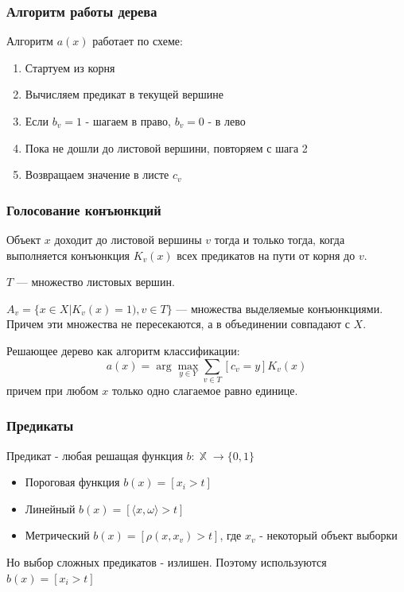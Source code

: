 \documentclass{beamer}
\DeclareMathOperator{\X}{\mathbb{X}}
\begin{document}
	\begin{frame}
		\frametitle{Алгоритм работы дерева}

		Алгоритм $a(x)$ работает по схеме:
		\begin{enumerate}
			\item Стартуем из корня
			\item Вычисляем предикат в текущей вершине
			\item Если $b_v = 1$ - шагаем в право, $b_v = 0$ - в лево
			\item Пока не дошли до листовой вершини, повторяем с шага 2
			\item Возвращаем значение в листе $c_v$
		\end{enumerate}
	\end{frame}

	\begin{frame}
		\frametitle{Голосование конъюнкций}
	
		Объект $x$ доходит до листовой вершины $v$ тогда и только тогда, когда выполняется конъюнкция
		$K_v(x)$ всех предикатов на пути от корня до $v$.

		\vspace{15pt}

		$T$ --- множество листовых вершин. 
		
		$A_v = \{x \in X | K_v(x) = 1), v \in T\}$ --- множества выделяемые конъюнкциями.
		Причем эти множества не пересекаются, а в объединении совпадают с $X$.
		
		\vspace{15pt}

		Решающее дерево как алгоритм классификации:
		\[
		a(x) = \arg \max_{y \in Y} \sum_{v \in T} [c_v = y] K_v(x)
		\]
		причем при любом $x$ только одно слагаемое равно единице.
	\end{frame}

	\begin{frame}
		\frametitle{Предикаты}

		Предикат - любая решащая функция $b :\X \rightarrow \{0, 1\}$
		
		\vspace{15pt}

		\begin{itemize}
			\item Пороговая функция $b(x) = [x_i > t]$
			\item Линейный $b(x) = [\langle x, \omega \rangle > t]$
			\item Метрический $b(x) = [\rho(x, x_v) > t]$, где $x_v$ - некоторый объект выборки
		\end{itemize}

		\vspace{15pt}

		Но выбор сложных предикатов - излишен. Поэтому используются $b(x) = [x_i > t]$
	\end{frame}
\end{document}
